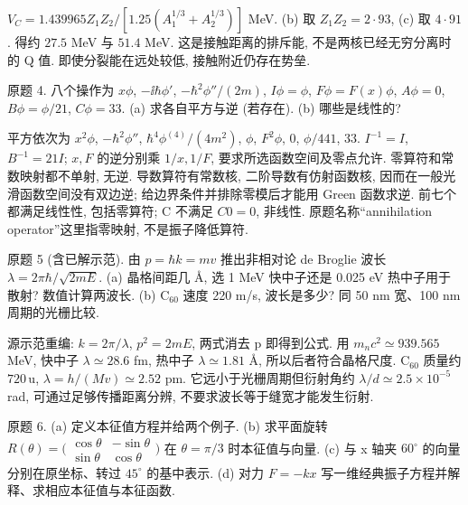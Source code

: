 \begin{solution}
$V_C=1.439965Z_1Z_2/[1.25(A_1^{1/3}+A_2^{1/3})]$ MeV. (b) 取 $Z_1Z_2=2\cdot93$, (c) 取 $4\cdot91$. 得约 $27.5$ MeV 与 $51.4$ MeV. 这是接触距离的排斥能, 不是两核已经无穷分离时的 Q 值. 即使分裂能在远处较低, 接触附近仍存在势垒.
\end{solution}
\begin{exercise}\label{ex:2202-1-4}
原题 4. 八个操作为 $x\phi$, $-\ii\hbar\phi'$, $-\hbar^2\phi''/(2m)$, $I\phi=\phi$, $F\phi=F(x)\phi$, $A\phi=0$, $B\phi=\phi/21$, $C\phi=33$. (a) 求各自平方与逆 (若存在). (b) 哪些是线性的?
\end{exercise}
\begin{solution}
平方依次为 $x^2\phi$, $-\hbar^2\phi''$, $\hbar^4\phi^{(4)}/(4m^2)$, $\phi$, $F^2\phi$, $0$, $\phi/441$, $33$. $I^{-1}=I$, $B^{-1}=21I$; $x,F$ 的逆分别乘 $1/x,1/F$, 要求所选函数空间及零点允许. 零算符和常数映射都不单射, 无逆. 导数算符有常数核, 二阶导数有仿射函数核, 因而在一般光滑函数空间没有双边逆; 给边界条件并排除零模后才能用 Green 函数求逆. 前七个都满足线性性, 包括零算符; C 不满足 $C0=0$, 非线性. 原题名称``annihilation operator''这里指零映射, 不是振子降低算符.
\end{solution}
\begin{exercise}\label{ex:2202-1-5}
原题 5 (含已解示范). 由 $p=\hbar k=mv$ 推出非相对论 de Broglie 波长 $\lambda=2\pi\hbar/\sqrt{2mE}$. (a) 晶格间距几 Å, 选 1 MeV 快中子还是 0.025 eV 热中子用于散射? 数值计算两波长. (b) C$_{60}$ 速度 220 m/s, 波长是多少? 同 50 nm 宽、100 nm 周期的光栅比较.
\end{exercise}
\begin{solution}
源示范重编: $k=2\pi/\lambda$, $p^2=2mE$, 两式消去 p 即得到公式. 用 $m_nc^2\simeq939.565$ MeV, 快中子 $\lambda\simeq28.6$ fm, 热中子 $\lambda\simeq1.81$ Å, 所以后者符合晶格尺度. C$_{60}$ 质量约 $720\,\mathrm u$, $\lambda=h/(Mv)\simeq2.52$ pm. 它远小于光栅周期但衍射角约 $\lambda/d\simeq2.5\times10^{-5}$ rad, 可通过足够传播距离分辨, 不要求波长等于缝宽才能发生衍射.
\end{solution}
\begin{exercise}\label{ex:2202-1-6}
原题 6. (a) 定义本征值方程并给两个例子. (b) 求平面旋转 $R(\theta)=\bigl(\begin{smallmatrix}\cos\theta&-\sin\theta\\\sin\theta&\cos\theta\end{smallmatrix}\bigr)$ 在 $\theta=\pi/3$ 时本征值与向量. (c) 与 x 轴夹 $60^\circ$ 的向量分别在原坐标、转过 $45^\circ$ 的基中表示. (d) 对力 $F=-kx$ 写一维经典振子方程并解释、求相应本征值与本征函数.
\end{exercise}
